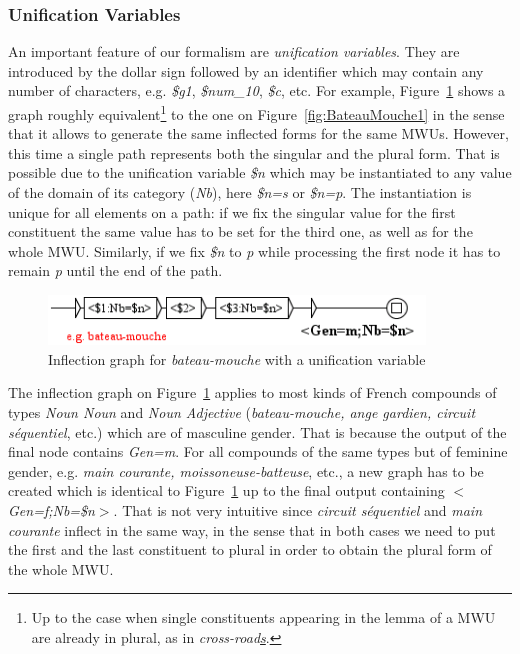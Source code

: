\subsubsection{Unification Variables}
An important feature of our formalism are \textit{unification variables}.
They are introduced by the dollar sign followed by
an identifier which may contain any number of characters, e.g. \emph{\$g1}, \emph{\$num\_10}, \emph{\$c}, etc.
For example, Figure~\ref{fig:BateauMouche2} shows a graph roughly 
equivalent\footnote{Up to the case when single constituents appearing in the lemma 
of a MWU are already in plural, as in \emph{cross-road\underline{s}}.} to the one 
on Figure~\ref{fig:BateauMouche1} in the sense that it allows to generate the same 
inflected forms for the same MWUs. However, this time a single path represents both 
the singular and the plural form. That is possible due to the unification variable 
\emph{\$n} which may be instantiated to any value of the domain of its category (\emph{Nb}), 
here \emph{\$n=s} or \emph{\$n=p}. The instantiation is unique for all elements on a path: 
if we fix the singular value for the first constituent the same value has to be set for the 
third one, as well as for the whole MWU. Similarly, if we fix \emph{\$n} to \emph{p} while 
processing the first node it has to remain \emph{p} until the end of the path.

\begin{figure}[!htb]
  \centering
  \includegraphics[width=10cm]{resources/img/BateauMouche2.png}
  \caption{Inflection graph for \emph{bateau-mouche} with a unification variable}
  \label{fig:BateauMouche2}
\end{figure}

\bigskip
\noindent The inflection graph on Figure~\ref{fig:BateauMouche2} applies to most kinds of 
French compounds of types \emph{Noun Noun} and \emph{Noun Adjective} (\emph{bateau-mouche, 
ange gardien, circuit s\'equentiel}, etc.) which are of masculine gender. That is 
because the output of the final node contains \emph{Gen=m}. For all compounds of the same 
types but of feminine gender, e.g. \emph{main courante, moissoneuse-batteuse}, etc., a new 
graph has to be created which is identical to Figure~\ref{fig:BateauMouche2} up to the final 
output containing \emph{$<$Gen=f;Nb=\$n$>$}. That is not very intuitive since 
\emph{circuit s\'equentiel} and \emph{main courante} inflect in the same way, in the sense 
that in both cases we need to put the first and the last constituent to plural in order to 
obtain the plural form of the whole MWU. 

